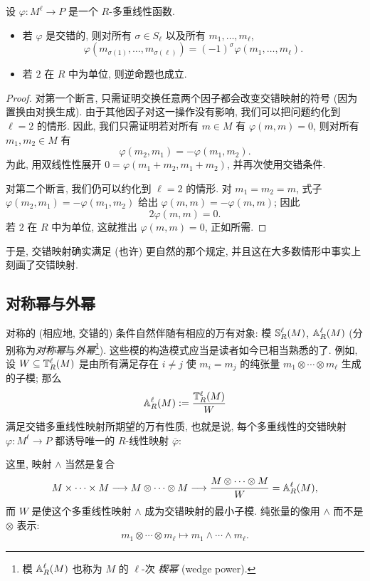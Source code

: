 \begin{lemma}\label{lem:alternating-sign}
设 $\varphi:M^\ell\to P$ 是一个 $R$-多重线性函数.
\begin{itemize}
\item 若 $\varphi$ 是交错的, 则对所有 $\sigma\in S_\ell$ 以及所有 $m_1,\dots,m_\ell$,
\[
\varphi(m_{\sigma(1)},\dots,m_{\sigma(\ell)})=(-1)^\sigma\varphi(m_1,\dots,m_\ell).
\]
\item 若 $2$ 在 $R$ 中为单位, 则逆命题也成立.
\end{itemize}
\end{lemma}

\begin{proof}
对第一个断言, 只需证明交换任意两个因子都会改变交错映射的符号 (因为置换由对换生成). 由于其他因子对这一操作没有影响, 我们可以把问题约化到 $\ell=2$ 的情形. 因此, 我们只需证明若对所有 $m\in M$ 有 $\varphi(m,m)=0$, 则对所有 $m_1,m_2\in M$ 有
\[
\varphi(m_2,m_1)=-\varphi(m_1,m_2).
\]
为此, 用双线性性展开 $0=\varphi(m_1+m_2,m_1+m_2)$, 并再次使用交错条件.

对第二个断言, 我们仍可以约化到 $\ell=2$ 的情形. 对 $m_1=m_2=m$, 式子 $\varphi(m_2,m_1)=-\varphi(m_1,m_2)$ 给出 $\varphi(m,m)=-\varphi(m,m)$; 因此
\[
2\varphi(m,m)=0.
\]
若 $2$ 在 $R$ 中为单位, 这就推出 $\varphi(m,m)=0$, 正如所需.
\end{proof}

于是, 交错映射确实满足 (也许) 更自然的那个规定, 并且这在大多数情形中事实上刻画了交错映射.

\subsection{对称幂与外幂}
\label{subsec:symmetric-exterior-powers}

对称的 (相应地, 交错的) 条件自然伴随有相应的万有对象: 模 $\mathbb{S}_R^\ell(M)$, $\mathbb{A}_R^\ell(M)$ (分别称为\emph{对称幂}与\emph{外幂}\footnote{模 $\mathbb{A}_R^\ell(M)$ 也称为 $M$ 的 $\ell$-次 \emph{楔幂} (wedge power).}). 这些模的构造模式应当是读者如今已相当熟悉的了. 例如, 设 $W\subseteq\mathbb{T}_R^\ell(M)$ 是由所有满足存在 $i\neq j$ 使 $m_i=m_j$ 的纯张量 $m_1\otimes\cdots\otimes m_\ell$ 生成的子模; 那么
\[
\mathbb{A}_R^\ell(M):=\frac{\mathbb{T}_R^\ell(M)}{W}
\]
满足交错多重线性映射所期望的万有性质, 也就是说, 每个多重线性的交错映射 $\varphi:M^\ell\to P$ 都诱导唯一的 $R$-线性映射 $\overline{\varphi}$:
\begin{center}
\end{center}
这里, 映射 $\wedge$ 当然是复合
\[
M\times\cdots\times M\longrightarrow M\otimes\cdots\otimes M\longrightarrow\frac{M\otimes\cdots\otimes M}{W}=\mathbb{A}_R^\ell(M),
\]
而 $W$ 是使这个多重线性映射 $\wedge$ 成为交错映射的最小子模. 纯张量的像用 $\wedge$ 而不是 $\otimes$ 表示:
\[
m_1\otimes\cdots\otimes m_\ell\longmapsto m_1\wedge\cdots\wedge m_\ell.
\]

